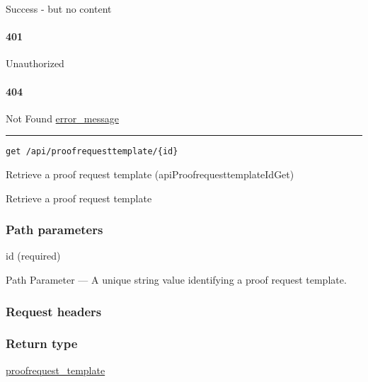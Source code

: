 Success - but no content \protect\hyperlink{}{}

\hypertarget{section-562}{%
\paragraph{401}\label{section-562}}

Unauthorized \protect\hyperlink{}{}

\hypertarget{section-563}{%
\paragraph{404}\label{section-563}}

Not Found \protect\hyperlink{error_message}{error\_message}

\begin{center}\rule{0.5\linewidth}{\linethickness}\end{center}

\protect\hypertarget{apiProofrequesttemplateIdGet}{}{}

\begin{verbatim}
get /api/proofrequesttemplate/{id}
\end{verbatim}

Retrieve a proof request template ({apiProofrequesttemplateIdGet})

Retrieve a proof request template

\hypertarget{path-parameters-94}{%
\subsubsection{Path parameters}\label{path-parameters-94}}

id (required)

{Path Parameter} --- A unique string value identifying a proof request
template.

\hypertarget{request-headers-96}{%
\subsubsection{Request headers}\label{request-headers-96}}

\hypertarget{return-type-133}{%
\subsubsection{Return type}\label{return-type-133}}

\protect\hyperlink{proofrequest_template}{proofrequest\_template}

